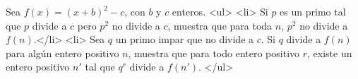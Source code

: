 Sea $f(x)=(x+b)^2-c$, con $b$ y $c$ enteros.
<ul> 
<li> Si $p$ es un primo tal que $p$ divide a $c$ pero $p^2$ no divide a $c$, muestra que para toda $n$, $p^2$ no divide a $f(n)$.</li>
<li>  Sea $q$ un primo impar que no divide a $c$. Si $q$ divide a $f(n)$ para algún entero positivo $n$, muestra que para todo entero positivo $r$, existe un entero positivo $n'$ tal que $q^r$ divide a $f(n')$.
</ul>